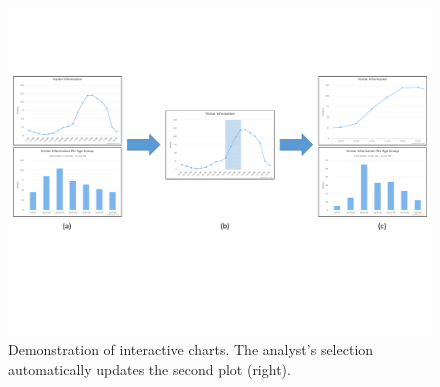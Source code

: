 \begin{figure}
	\includegraphics[width=\textwidth]{figures/highchart_final_a.pdf}
	\caption{Demonstration of interactive charts. The analyst's selection automatically updates the second plot (right).}
	\label{fig:vision}
\end{figure}

